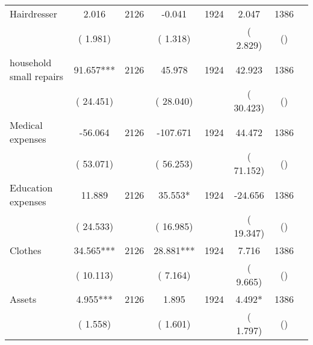 \begin{tabular}{l*{6}{c}}
Hairdresser        &              2.016      &       2126       &             -0.041      &       1924       &              2.047      &       1386  &  &              \\
                       &       (       1.981)            &                               &       (       1.318)            &                               &       (       2.829)            &       () &                  \\
household small repairs        &             91.657***      &       2126       &             45.978      &       1924       &             42.923      &       1386  &  &              \\
                       &       (      24.451)            &                               &       (      28.040)            &                               &       (      30.423)            &       () &                  \\
Medical expenses        &            -56.064      &       2126       &           -107.671      &       1924       &             44.472      &       1386  &  &              \\
                       &       (      53.071)            &                               &       (      56.253)            &                               &       (      71.152)            &       () &                  \\
Education expenses        &             11.889      &       2126       &             35.553*      &       1924       &            -24.656      &       1386  &  &              \\
                       &       (      24.533)            &                               &       (      16.985)            &                               &       (      19.347)            &       () &                  \\
Clothes        &             34.565***      &       2126       &             28.881***      &       1924       &              7.716      &       1386  &  &              \\
                       &       (      10.113)            &                               &       (       7.164)            &                               &       (       9.665)            &       () &                  \\
Assets        &              4.955***      &       2126       &              1.895      &       1924       &              4.492*      &       1386  &  &              \\
                       &       (       1.558)            &                               &       (       1.601)            &                               &       (       1.797)            &       () &                  \\

\end{tabular}
